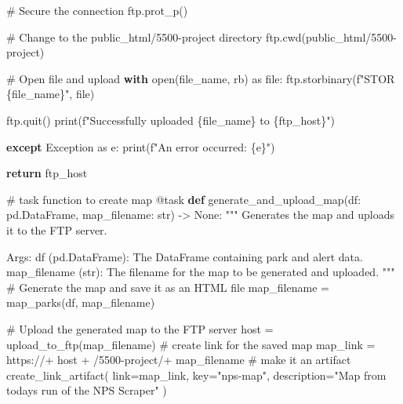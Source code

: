 \documentclass[
  letterpaper,
  DIV=11,
  numbers=noendperiod]{scrartcl}
\newenvironment{Shaded}{\begin{snugshade}}{\end{snugshade}}
\newcommand{\AttributeTok}[1]{\textcolor[rgb]{0.40,0.45,0.13}{#1}}
\newcommand{\BuiltInTok}[1]{\textcolor[rgb]{0.00,0.23,0.31}{#1}}
\newcommand{\CommentTok}[1]{\textcolor[rgb]{0.37,0.37,0.37}{#1}}
\newcommand{\ControlFlowTok}[1]{\textcolor[rgb]{0.00,0.23,0.31}{\textbf{#1}}}
\newcommand{\ImportTok}[1]{\textcolor[rgb]{0.00,0.46,0.62}{#1}}
\newcommand{\KeywordTok}[1]{\textcolor[rgb]{0.00,0.23,0.31}{\textbf{#1}}}
\newcommand{\NormalTok}[1]{\textcolor[rgb]{0.00,0.23,0.31}{#1}}
\newcommand{\OperatorTok}[1]{\textcolor[rgb]{0.37,0.37,0.37}{#1}}
\newcommand{\PreprocessorTok}[1]{\textcolor[rgb]{0.68,0.00,0.00}{#1}}
\newcommand{\SpecialCharTok}[1]{\textcolor[rgb]{0.37,0.37,0.37}{#1}}
\newcommand{\SpecialStringTok}[1]{\textcolor[rgb]{0.13,0.47,0.30}{#1}}
\newcommand{\StringTok}[1]{\textcolor[rgb]{0.13,0.47,0.30}{#1}}
\newcommand{\VariableTok}[1]{\textcolor[rgb]{0.07,0.07,0.07}{#1}}
\begin{document}
\begin{Shaded}
\begin{Highlighting}[]
        \CommentTok{\# Secure the connection}
\NormalTok{        ftp.prot\_p()}

        \CommentTok{\# Change to the public\_html/5500{-}project directory}
\NormalTok{        ftp.cwd(}\StringTok{\textquotesingle{}public\_html/5500{-}project\textquotesingle{}}\NormalTok{)}

        \CommentTok{\# Open file and upload}
        \ControlFlowTok{with} \BuiltInTok{open}\NormalTok{(file\_name, }\StringTok{\textquotesingle{}rb\textquotesingle{}}\NormalTok{) }\ImportTok{as} \BuiltInTok{file}\NormalTok{:}
\NormalTok{            ftp.storbinary(}\SpecialStringTok{f"STOR }\SpecialCharTok{\{}\NormalTok{file\_name}\SpecialCharTok{\}}\SpecialStringTok{"}\NormalTok{, }\BuiltInTok{file}\NormalTok{)}

\NormalTok{        ftp.quit()}
        \BuiltInTok{print}\NormalTok{(}\SpecialStringTok{f"Successfully uploaded }\SpecialCharTok{\{}\NormalTok{file\_name}\SpecialCharTok{\}}\SpecialStringTok{ to }\SpecialCharTok{\{}\NormalTok{ftp\_host}\SpecialCharTok{\}}\SpecialStringTok{"}\NormalTok{)}

    \ControlFlowTok{except} \PreprocessorTok{Exception} \ImportTok{as}\NormalTok{ e:}
        \BuiltInTok{print}\NormalTok{(}\SpecialStringTok{f"An error occurred: }\SpecialCharTok{\{}\NormalTok{e}\SpecialCharTok{\}}\SpecialStringTok{"}\NormalTok{)}

    \ControlFlowTok{return}\NormalTok{ ftp\_host}


\CommentTok{\# task function to create map}
\AttributeTok{@task}
\KeywordTok{def}\NormalTok{ generate\_and\_upload\_map(df: pd.DataFrame, map\_filename: }\BuiltInTok{str}\NormalTok{) }\OperatorTok{{-}\textgreater{}} \VariableTok{None}\NormalTok{:}
    \CommentTok{"""}
\CommentTok{    Generates the map and uploads it to the FTP server.}

\CommentTok{    Args:}
\CommentTok{        df (pd.DataFrame): The DataFrame containing park and alert data.}
\CommentTok{        map\_filename (str): The filename for the map to be generated and uploaded.}
\CommentTok{    """}
    \CommentTok{\# Generate the map and save it as an HTML file}
\NormalTok{    map\_filename }\OperatorTok{=}\NormalTok{ map\_parks(df, map\_filename)}

    \CommentTok{\# Upload the generated map to the FTP server}
\NormalTok{    host }\OperatorTok{=}\NormalTok{ upload\_to\_ftp(map\_filename)}
    \CommentTok{\# create link for the saved map}
\NormalTok{    map\_link }\OperatorTok{=} \StringTok{\textquotesingle{}https://\textquotesingle{}}\OperatorTok{+}\NormalTok{ host }\OperatorTok{+} \StringTok{\textquotesingle{}/5500{-}project/\textquotesingle{}}\OperatorTok{+}\NormalTok{ map\_filename}
    \CommentTok{\# make it an artifact}
\NormalTok{    create\_link\_artifact(}
\NormalTok{        link}\OperatorTok{=}\NormalTok{map\_link,}
\NormalTok{        key}\OperatorTok{=}\StringTok{"nps{-}map"}\NormalTok{,}
\NormalTok{        description}\OperatorTok{=}\StringTok{"Map from todays run of the NPS Scraper"}
\NormalTok{    )}


\end{Highlighting}
\end{Shaded}
\end{document}
